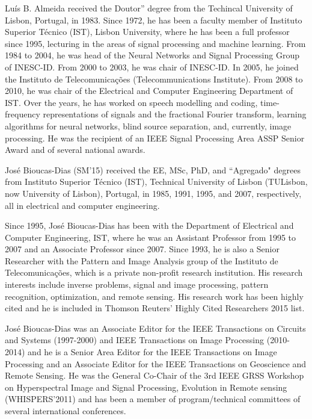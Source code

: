\documentclass[10pt,twocolumn,twoside]{IEEEtran}
\begin{document}
\begin{IEEEbiography}{Lu\'is B. Almeida}
	received the Doutor” degree from the Techincal University of Lisbon, Portugal, in 1983. Since 1972, he has been a faculty member of Instituto Superior T\'{e}cnico (IST), Lisbon University, where he has been a full professor since 1995, lecturing in the areas of signal processing and machine learning. From 1984 to 2004, he was head of the Neural Networks and Signal Processing Group of INESC-ID. From 2000 to 2003, he was chair of INESC-ID. In 2005, he joined the Instituto de Telecomunica\c{c}\~{o}es (Telecommunications Institute). From 2008 to 2010, he was chair of the Electrical and Computer Engineering Department of IST. Over the years, he has worked on speech modelling and coding, time-frequency representations of signals and the fractional Fourier transform, learning algorithms for neural networks, blind source separation, and, currently, image processing. He was the recipient of an IEEE Signal Processing Area ASSP Senior Award and of several national awards.
\end{IEEEbiography}

\begin{IEEEbiography}{Jos\'e Bioucas-Dias}
	(SM'15) received the EE, MSc, PhD, and ``Agregado" degrees from Instituto Superior T\'ecnico (IST), Technical University of Lisbon (TULisbon, now University of Lisbon), Portugal, in 1985, 1991, 1995, and 2007, respectively, all in electrical and computer engineering.

	Since 1995, Jos\'e Bioucas-Dias has been with the Department of Electrical and Computer Engineering, IST, where he was an Assistant Professor from 1995 to 2007 and an Associate Professor since 2007. Since 1993, he is also a Senior Researcher with the Pattern and Image Analysis group of the Instituto de Telecomunica\c{c}\~oes, which is a private  non-profit research institution. His  research interests include inverse problems, signal and image processing, pattern recognition, optimization, and remote sensing. His research work has been highly cited and he is included in Thomson Reuters' Highly Cited Researchers 2015 list.

	Jos\'e Bioucas-Dias was an Associate Editor for the {\sc IEEE Transactions on Circuits and Systems} (1997-2000) and  {\sc IEEE Transactions on Image Processing} (2010-2014) and he is  a Senior Area  Editor for the {\sc IEEE Transactions on Image Processing} and an Associate Editor for the {\sc IEEE Transactions on Geoscience and Remote Sensing}.  He was the General Co-Chair of the 3rd IEEE GRSS Workshop on Hyperspectral Image and Signal Processing, Evolution in Remote sensing (WHISPERS'2011) and has been a member of program/technical committees of several international conferences.
\end{IEEEbiography}
\end{document}
